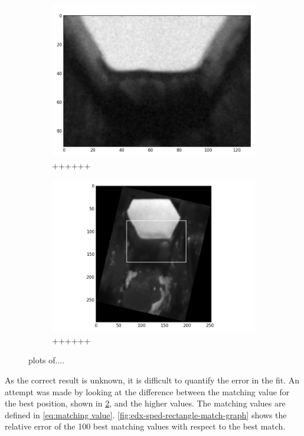 \begin{figure}
\begin{subfigure}{.5\textwidth}
	\centering
	\includegraphics[width=\linewidth]{fig/se_image_in_sped_with_rectangle.png}
	\caption{++++++}
	\label{fig:edx-in-sped-edx}
\end{subfigure}%
\begin{subfigure}{.5\textwidth}
	\centering
	\includegraphics[width=\linewidth]{fig/sped-with-rectangle.png}
	\caption{++++++}
	\label{fig:edx-in-sped-rectangle}
\end{subfigure}
\caption{plots of....}
\label{fig:edx-in-sped}
\end{figure}

As the correct result is unknown, it is difficult to quantify the error in the fit. An attempt was made by looking at the difference between the matching value for the best position, shown in \cref{fig:edx-in-sped-rectangle}, and the higher values. The matching values are defined in \cref{eq:matching value}. \cref{fig:edx-sped-rectangle-match-graph} shows the relative error of the 100 best matching values with respect to the best match. 

